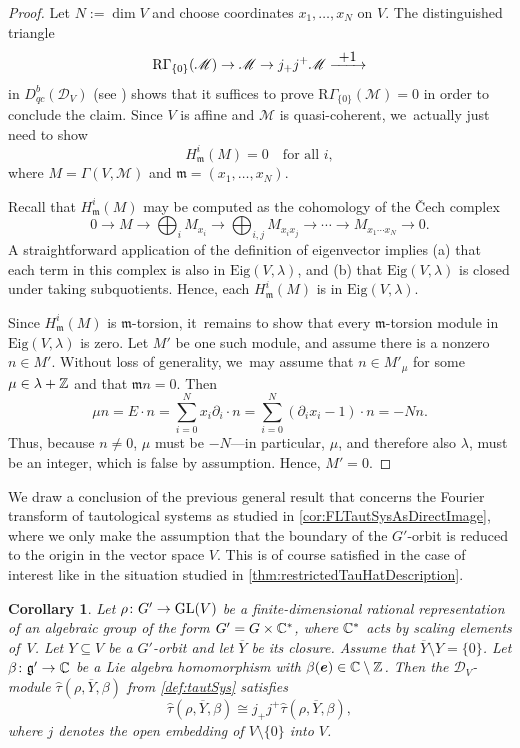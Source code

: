 \documentclass[11pt]{article}
\newcommand{\To}[1]{\mathchoice{\xrightarrow{\textstyle\kern4pt#1\kern3pt}}{\xrightarrow{\,#1\,}}{}{}}
\newcommand{\bme}{{\boldsymbol{e}}}
\newcommand{\Eig}{\mathrm{Eig}}
\newtheorem{cor}[thm]{Corollary}
\newcommand{\frg}{\mathfrak{g}}
\DeclareMathOperator{\GL}{\textup{GL}}
\begin{document}
\begin{proof}
Let $N := \dim V$ and choose coordinates $x_1,\dots,x_N$ on $V$. The distinguished triangle
\[
\mathrm{R}\Gamma_{\{0\}}(\mathscr{M}) \to \mathscr{M} \to j_+j^+\mathscr{M} \To{+1}
\]
in $D_{qc}^b(\mathscr D_V)$ (see \cite[Prop.\,1.7.1(i)]{Hotta}) shows that it suffices to prove $\mathrm{R}\Gamma_{\{0\}}(\mathscr{M}) = 0$ in order to conclude the claim. Since $V$ is affine and $\mathscr{M}$ is quasi-coherent, we~actually just need to show
\[
H^i_{\mathfrak{m}}(M)=0\quad\text{for all }i,
\]
where $M=\Gamma(V, \mathscr{M})$ and $\mathfrak{m}=(x_1,\ldots,x_N)$.

Recall that $H^i_\mathfrak{m}(M)$ may be computed as the cohomology of the \v{C}ech complex
\[
0 \to M \to \bigoplus_{i} M_{x_i} \to \bigoplus_{i,j} M_{x_ix_j} \to \cdots \to M_{x_1\cdots x_N}\to 0.
\]
A straightforward application of the definition of eigenvector implies (a) that each term in this complex is also in $\Eig(V,\lambda)$, and (b) that $\Eig(V,\lambda)$ is closed under taking subquotients. Hence, each $H^i_\mathfrak{m}(M)$ is in $\Eig(V,\lambda)$.

Since $H^i_\mathfrak{m}(M)$ is $\mathfrak{m}$-torsion, it~remains to show that every $\mathfrak{m}$-torsion module in $\Eig(V,\lambda)$ is zero. Let $M'$ be one such module, and assume there is a nonzero $n\in M'$. Without loss of generality, we~may assume that $n\in M'_\mu$ for some $\mu\in \lambda +{\mathbb Z}$ and that $\mathfrak{m}n=0$. Then
\[
\mu n = E\cdot n
= \sum_{i=0}^N x_i\partial_i \cdot n
= \sum_{i=0}^N (\partial_i x_i -1) \cdot n = -N n.
\]
Thus, because $n\neq 0$, $\mu$ must be $-N$---in particular, $\mu$, and therefore also $\lambda$, must be an integer, which is false by assumption. Hence, $M'=0$.
\end{proof}
We draw a conclusion of the previous general result that concerns the Fourier transform of tautological systems as studied in \cref{cor:FLTautSysAsDirectImage}, where we only make the assumption that the boundary of the $G'$-orbit is reduced to the origin in the vector space $V$. This is of course satisfied in the case of interest like in the situation studied in \cref{thm:restrictedTauHatDescription}.

\begin{cor} \label{cor:localization}
Let $\rho \colon G' \to \GL(V)$ be a finite-dimensional rational representation of an algebraic group of the form $G' = G \times {\mathbb C}^*$, where ${\mathbb C}^*$ acts by scaling elements of~$V$. Let $Y \subseteq V$ be a $G'$-orbit and let $\overline{Y}$ be its closure. Assume that $\overline{Y}\setminus Y = \{0\}$.
Let $\beta \colon \frg' \to \C$ be a Lie algebra homomorphism with $\beta(\bme) \in \C \setminus \Z$. Then the $\mathscr{D}_V$\nobreakdash-mod\-ule $\hat\tau(\rho,\overline{Y},\beta)$ from \cref{def:tautSys} satisfies
\[
\hat\tau(\rho,\overline{Y},\beta) \cong j_+ j^+\hat \tau(\rho,\overline{Y},\beta),
\]
where $j$ denotes the open embedding of $V \setminus \{0\}$ into $V$.
\end{cor}
\end{document}
